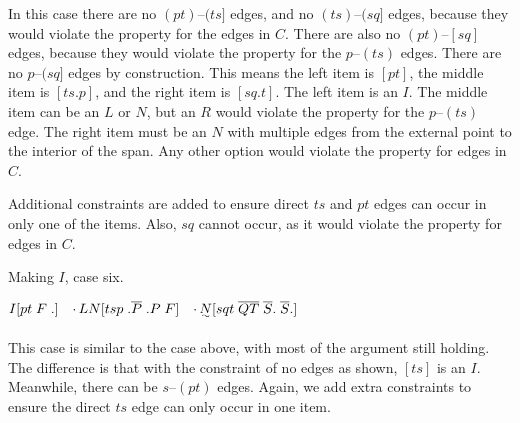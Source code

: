In this case there are no $(pt)$--$(ts]$ edges, and no $(ts)$--$(sq]$ edges, because they would violate the \oneEC property for the edges in $C$.
There are also no $(pt)$--$[sq]$ edges, because they would violate the \oneEC property for the $p$--$(ts)$ edges.
There are no $p$--$(sq]$ edges by construction.
This means the left item is $[pt]$, the middle item is $[ts.p]$, and the right item is $[sq.t]$.
The left item is an $I$.
The middle item can be an $L$ or $N$, but an $R$ would violate the \oneEC property for the $p$--$(ts)$ edge.
The right item must be an $N$ with multiple edges from the external point to the interior of the span.
Any other option would violate the \oneEC property for edges in $C$.

Additional constraints are added to ensure direct $ts$ and $pt$ edges can occur in only one of the items.
Also, $sq$ cannot occur, as it would violate the \oneEC property for edges in $C$.

\begin{finalEquation}
\caption{Making $I$, case six.}
  $I[pt \; F \; .] \quad \cdotp LN[tsp \; .\overline{P} \; .P \; F] \quad \cdotp \uwave{N}[sqt \; \overline{QT} \; \overline{S}. \; \overline{S}.]$
\end{finalEquation}

\begin{center}
\end{center}

This case is similar to the case above, with most of the argument still holding.
The difference is that with the constraint of no edges as shown, $[ts]$ is an $I$.
Meanwhile, there can be $s$--$(pt)$ edges.
Again, we add extra constraints to ensure the direct $ts$ edge can only occur in one item.


